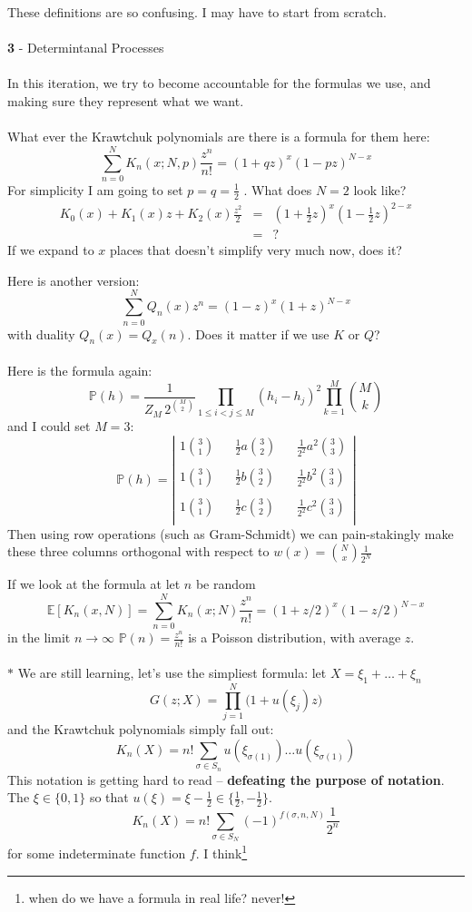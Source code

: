 \documentclass[12pt]{article}
\begin{document}
\noindent These definitions are so confusing.  I may have to start from scratch. \\ \\
\textbf{3} - Determintanal Processes  \\ \\
In this iteration, we try to become accountable for the formulas we use, and making sure they represent what we want. \\ \\
What ever the Krawtchuk polynomials are there is a formula for them here:
$$ \sum_{n=0}^N K_n (x; N, p) \frac{z^n}{n!} 
= (1+qz)^x (1 - pz)^{N-x} $$
For simplicity I am going to set $p = q = \frac{1}{2}$ .  What does $N = 2$ look like?
\begin{eqnarray*} K_0(x) + K_1(x)z + K_2(x) \frac{z^2}{2}
&=& (1+\tfrac{1}{2}z)^x (1 - \tfrac{1}{2}z)^{2-x} \\
&=& ? \end{eqnarray*}
If we expand to $x$ places that doesn't simplify very much now, does it?   \newpage

\noindent Here is another version:
$$ \sum_{n=0}^N Q_n(x) z^n = (1 - z)^x(1+z)^{N-x} $$
with duality $Q_n(x) = Q_x(n)$.  Does it matter if we use $K$ or $Q$? \\ \\
Here is the formula again:
$$ \mathbb{P}(h)
= \frac{1}{Z_M \, 2^{\binom{M}{2}}} \prod_{1 \leq i < j \leq M}
(h_i - h_j)^2 \prod_{k=1}^M
\binom{M}{k}
 $$
and I could set $M = 3$:
$$ \mathbb{P}(h) = \left|
\begin{array}{ccccc}
1 \binom{3}{1} & &\frac{1}{2}a \binom{3}{2}& &\frac{1}{2^2}a^2 \binom{3}{3}\\ \\
1 \binom{3}{1}& &\frac{1}{2}b \binom{3}{2}& &\frac{1}{2^2}b^2 \binom{3}{3}\\ \\
1 \binom{3}{1}& &\frac{1}{2}c \binom{3}{2}& &\frac{1}{2^2}c^2 \binom{3}{3}\\
 \end{array}
 \right| $$
Then using row operations (such as Gram-Schmidt) we can pain-stakingly make these three columns orthogonal with respect to $w(x) = \binom{N}{x}\frac{1}{2^N}$

\newpage

If we look at the formula at let $n$ be random
$$\mathbb{E}[ K_n(x,N) ] = \sum_{n=0}^N K_n (x; N) \frac{z^n}{n!} 
= (1+z/2)^x (1 - z/2)^{N-x} $$
in the limit $n \to \infty$ $\mathbb{P}(n) = \frac{z^n}{n!}$ is a Poisson distribution, with average $z$. \\ \\
$\ast$ We are still learning, let's use the simpliest formula: let $X = \xi_1 + \dots + \xi_n $
$$ G(z; X) = \prod_{j=1}^N \big(1 + u(\xi_j)z\big) $$
and the Krawtchuk polynomials simply fall out:
$$ K_n(X) = n! \sum_{\sigma \in S_n} u(\xi_{\sigma(1)})\dots u(\xi_{\sigma(1)}) $$
This notation is getting hard to read -- \textbf{defeating the purpose of notation}. The $\xi \in \{ 0,1\}$ so that $u(\xi) = \xi - \frac{1}{2} \in \{ \frac{1}{2}, - \frac{1}{2}\}$.
$$ K_n(X) = n! \sum_{\sigma \in S_N} (-1)^{f(\sigma, n, N)} \frac{1}{2^n} $$
for some indeterminate function $f$.  I think\footnote{when do we have a formula in real life?  never!}
\end{document}
